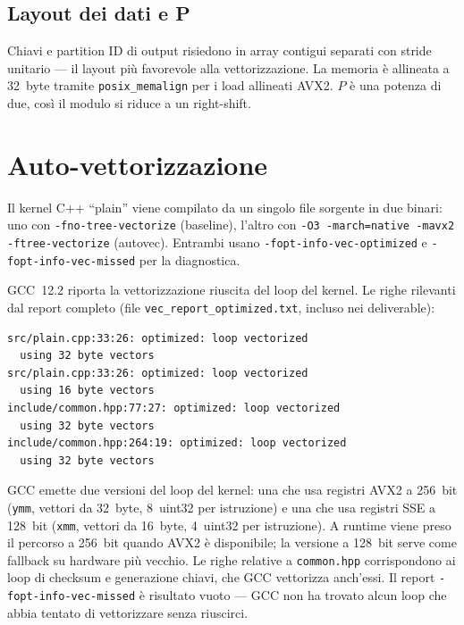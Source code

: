 \documentclass[10pt,a4paper,twocolumn]{article}
\begin{document}
\subsection{Layout dei dati e P}

Chiavi e partition ID di output risiedono in array contigui separati con stride unitario --- il layout più favorevole alla vettorizzazione. La memoria è allineata a 32~byte tramite \texttt{posix\_memalign} per i load allineati AVX2. $P$ è una potenza di due, così il modulo si riduce a un right-shift.

\section{Auto-vettorizzazione}

Il kernel C++ ``plain'' viene compilato da un singolo file sorgente in due binari: uno con \texttt{-fno-tree-vectorize} (baseline), l'altro con \texttt{-O3 -march=native -mavx2 -ftree-vectorize} (autovec). Entrambi usano \texttt{-fopt-info-vec-optimized} e \texttt{-fopt-info-vec-missed} per la diagnostica.

GCC~12.2 riporta la vettorizzazione riuscita del loop del kernel. Le righe rilevanti dal report completo (file \texttt{vec\_report\_optimized.txt}, incluso nei deliverable):

\begin{lstlisting}
src/plain.cpp:33:26: optimized: loop vectorized
  using 32 byte vectors
src/plain.cpp:33:26: optimized: loop vectorized
  using 16 byte vectors
include/common.hpp:77:27: optimized: loop vectorized
  using 32 byte vectors
include/common.hpp:264:19: optimized: loop vectorized
  using 32 byte vectors
\end{lstlisting}

GCC emette due versioni del loop del kernel: una che usa registri AVX2 a 256~bit (\texttt{ymm}, vettori da 32~byte, 8~uint32 per istruzione) e una che usa registri SSE a 128~bit (\texttt{xmm}, vettori da 16~byte, 4~uint32 per istruzione). A runtime viene preso il percorso a 256~bit quando AVX2 è disponibile; la versione a 128~bit serve come fallback su hardware più vecchio. Le righe relative a \texttt{common.hpp} corrispondono ai loop di checksum e generazione chiavi, che GCC vettorizza anch'essi. Il report \texttt{-fopt-info-vec-missed} è risultato vuoto --- GCC non ha trovato alcun loop che abbia tentato di vettorizzare senza riuscirci.
\end{document}
